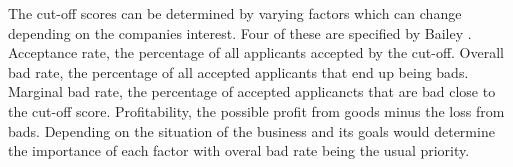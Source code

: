 The cut-off scores can be determined by varying factors which can change depending on the companies interest. Four of these are specified by Bailey \cite{bailey2004credit}. Acceptance rate, the percentage of all applicants accepted by the cut-off. Overall bad rate, the percentage of all accepted applicants that end up being bads. Marginal bad rate, the percentage of accepted applicancts that are bad close to the cut-off score. Profitability, the possible profit from goods minus the loss from bads. Depending on the situation of the business and its goals would determine the importance of each factor with overal bad rate being the usual priority.



%
%

